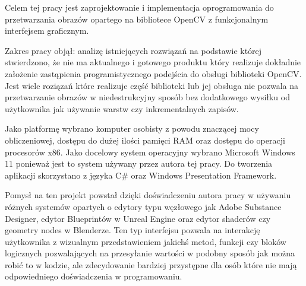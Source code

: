 Celem tej pracy jest zaprojektowanie i implementacja oprogramowania do przetwarzania obrazów opartego na bibliotece OpenCV z funkcjonalnym interfejsem graficznym.

Zakres pracy objął: analizę istniejących rozwiązań na podstawie której stwierdzono, że nie ma aktualnego i gotowego produktu który realizuje dokładnie założenie zastąpienia programistycznego podejścia do obsługi biblioteki OpenCV. Jest wiele roziązań które realizuje część biblioteki lub jej obsługa nie pozwala na przetwarzanie obrazów w niedestrukcyjny sposób bez dodatkowego wysiłku od użytkownika jak używanie warstw czy inkrementalnych zapisów. 

Jako platformę wybrano komputer osobisty z powodu znaczącej mocy obliczeniowej, dostępu do dużej ilości pamięci RAM oraz dostępu do operacji procesorów x86. \cite{x86opencv} Jako docelowy system operacyjny wybrano Microsoft Windows 11 ponieważ jest to system używany przez autora tej pracy. Do tworzenia aplikacji skorzystano z języka C\# oraz Windows Presentation Framework. 

Pomysł na ten projekt powstał dzięki doświadczeniu autora pracy w używaniu różnych systemów opartych o edytory typu węzłowego jak Adobe Substance Designer, edytor Blueprintów w Unreal Engine oraz edytor shaderów czy geometry nodes w Blenderze. Ten typ interfejsu pozwala na interakcję użytkownika z wizualnym przedstawieniem jakichś metod, funkcji czy bloków logicznych pozwalających na przesyłanie wartości w podobny sposób jak można robić to w kodzie, ale zdecydowanie bardziej przystępne dla osób które nie mają odpowiedniego doświadczenia w programowaniu.  